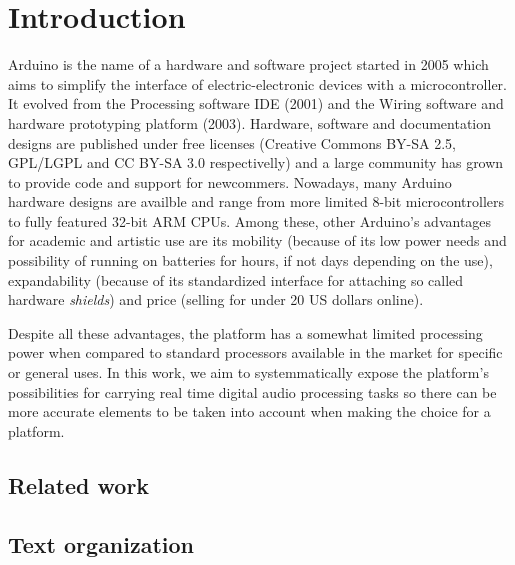 
\section{Introduction}


Arduino is the name of a hardware and software project started in 2005 which
aims to simplify the interface of electric-electronic devices with a
microcontroller. It evolved from the Processing software IDE (2001) and the
Wiring software and hardware prototyping platform (2003). Hardware, software
and documentation designs are published under free licenses (Creative Commons
BY-SA 2.5, GPL/LGPL and CC BY-SA 3.0 respectivelly) and a large community has
grown to provide code and support for newcommers. Nowadays, many Arduino
hardware designs are availble and range from more limited 8-bit
microcontrollers to fully featured 32-bit ARM CPUs. Among these, other
Arduino's advantages for academic and artistic use are its mobility (because
of its low power needs and possibility of running on batteries for hours, if
not days depending on the use), expandability (because of its standardized
interface for attaching so called hardware \emph{shields}) and price (selling
for under 20 US dollars online).

Despite all these advantages, the platform has a somewhat limited processing
power when compared to standard processors available in the market for
specific or general uses. In this work, we aim to systemmatically expose the
platform's possibilities for carrying real time digital audio processing tasks
so there can be more accurate elements to be taken into account when making
the choice for a platform.


\subsection{Related work}




\subsection{Text organization}

